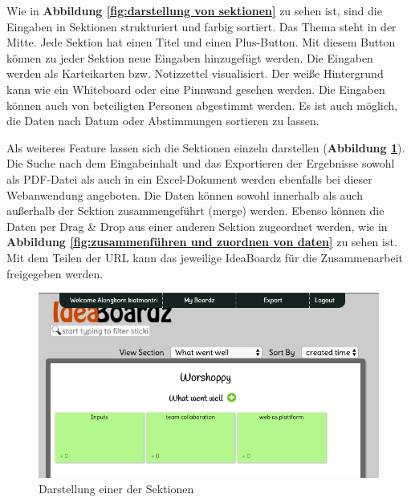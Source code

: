 Wie in \textbf{Abbildung \ref{fig:darstellung von sektionen}} zu sehen ist, sind die Eingaben in Sektionen strukturiert und farbig sortiert. Das Thema steht in der Mitte. Jede Sektion hat einen Titel und einen Plus-Button. Mit diesem Button können zu jeder Sektion neue Eingaben hinzugefügt werden. Die Eingaben werden als Karteikarten bzw. Notizzettel visualisiert. Der weiße Hintergrund kann wie ein Whiteboard oder eine Pinnwand gesehen werden. Die Eingaben können auch von beteiligten Personen abgestimmt werden. Es ist auch möglich, die Daten nach Datum oder Abstimmungen sortieren zu lassen.\bigskip

Als weiteres Feature lassen sich die Sektionen einzeln darstellen (\textbf{Abbildung \ref{fig:darstellung einer der sektionen}}). Die Suche nach dem Eingabeinhalt und das Exportieren der Ergebnisse sowohl als PDF-Datei als auch in ein Excel-Dokument werden ebenfalls bei dieser Webanwendung angeboten. Die Daten können sowohl innerhalb als auch außerhalb der Sektion zusammengeführt (merge) werden. Ebenso können die Daten per Drag \& Drop aus einer anderen Sektion zugeordnet werden, wie in \textbf{Abbildung \ref{fig:zusammenführen und zuordnen von daten}} zu sehen ist. Mit dem Teilen der URL kann das jeweilige IdeaBoardz für die Zusammenarbeit freigegeben werden.

\begin{figure}[H]
  \begin{center}
    \includegraphics[scale=0.4]{img/ideaBoardz3}
	\caption{Darstellung einer der Sektionen} 
	\label{fig:darstellung einer der sektionen}
  \end{center}   
\end{figure}


